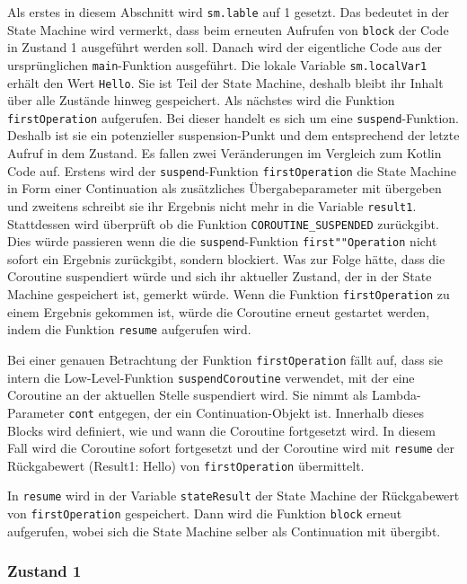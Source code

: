 \documentclass[fontsize=12pt,paper=a4,twoside=semi,parskip=half-,headsepline,headinclude]{scrreprt}
\begin{document}
Als erstes in diesem Abschnitt wird \texttt{sm.lable} auf 1 gesetzt. Das bedeutet in der State Machine wird vermerkt, dass beim erneuten Aufrufen von \texttt{block} der Code in Zustand 1 ausgeführt werden soll. Danach wird der eigentliche Code aus der ursprünglichen \texttt{main}-Funktion ausgeführt. Die lokale Variable \texttt{sm.localVar1} erhält den Wert \texttt{Hello}. Sie ist Teil der State Machine, deshalb bleibt ihr Inhalt über alle Zustände hinweg gespeichert. Als nächstes wird die Funktion \texttt{firstOperation} aufgerufen. Bei dieser handelt es sich um eine \texttt{suspend}-Funktion. Deshalb ist sie ein potenzieller suspension-Punkt und dem entsprechend der letzte Aufruf in dem Zustand. Es fallen zwei Veränderungen im Vergleich zum Kotlin Code auf. Erstens wird der \texttt{suspend}-Funktion \texttt{firstOperation} die State Machine in Form einer Continuation als zusätzliches Übergabeparameter mit übergeben und zweitens schreibt sie ihr Ergebnis nicht mehr in die Variable \texttt{result1}. Stattdessen wird überprüft ob die Funktion \texttt{COROUTINE\_SUSPENDED} zurückgibt\cite{Akhin2024}. Dies würde passieren wenn die die \texttt{suspend}-Funktion \texttt{first""Operation} nicht sofort ein Ergebnis zurückgibt, sondern blockiert. Was zur Folge hätte, dass die Coroutine suspendiert würde und sich ihr aktueller Zustand, der in der State Machine gespeichert ist, gemerkt würde. Wenn die Funktion \texttt{firstOperation} zu einem Ergebnis gekommen ist, würde die Coroutine erneut gestartet werden, indem die Funktion \texttt{resume} aufgerufen wird.

Bei einer genauen Betrachtung der Funktion \texttt{firstOperation} fällt auf, dass sie intern die Low-Level-Funktion \texttt{suspendCoroutine} verwendet, mit der eine Coroutine an der aktuellen Stelle suspendiert wird. Sie nimmt als Lambda-Parameter \texttt{cont} entgegen, der ein Continuation-Objekt ist. Innerhalb dieses Blocks wird definiert, wie und wann die Coroutine fortgesetzt wird. In diesem Fall wird die Coroutine sofort fortgesetzt und der Coroutine wird mit \texttt{resume} der Rückgabewert (Result1: Hello) von \texttt{firstOperation} übermittelt.

In \texttt{resume} wird in der Variable \texttt{stateResult} der State Machine der Rückgabewert von \texttt{firstOperation} gespeichert. Dann wird die Funktion \texttt{block} erneut aufgerufen, wobei sich die State Machine selber als Continuation mit übergibt.

\subsubsection{Zustand 1}
\end{document}
